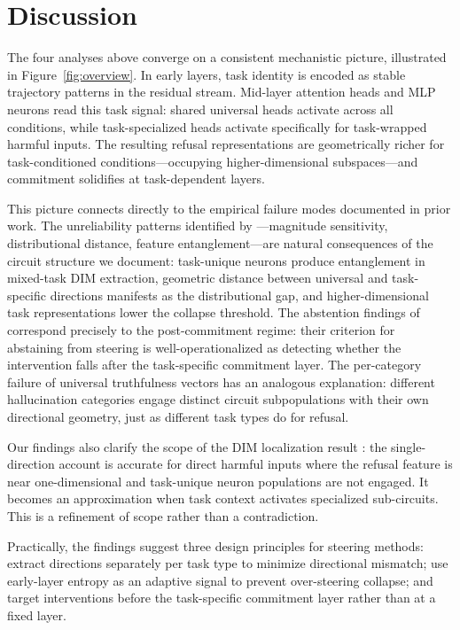 \documentclass[11pt]{article}
\begin{document}
\section{Discussion}
\label{sec:discussion}

The four analyses above converge on a consistent mechanistic picture, illustrated in Figure~\ref{fig:overview}. In early layers, task identity is encoded as stable trajectory patterns in the residual stream. Mid-layer attention heads and MLP neurons read this task signal: shared universal heads activate across all conditions, while task-specialized heads activate specifically for task-wrapped harmful inputs. The resulting refusal representations are geometrically richer for task-conditioned conditions---occupying higher-dimensional subspaces---and commitment solidifies at task-dependent layers.

This picture connects directly to the empirical failure modes documented in prior work. The unreliability patterns identified by \citet{braun2025unreliability}---magnitude sensitivity, distributional distance, feature entanglement---are natural consequences of the circuit structure we document: task-unique neurons produce entanglement in mixed-task DIM extraction, geometric distance between universal and task-specific directions manifests as the distributional gap, and higher-dimensional task representations lower the collapse threshold. The abstention findings of \citet{hedstrom2025steer} correspond precisely to the post-commitment regime: their criterion for abstaining from steering is well-operationalized as detecting whether the intervention falls after the task-specific commitment layer. The per-category failure of universal truthfulness vectors \citep{wang2025adaptive} has an analogous explanation: different hallucination categories engage distinct circuit subpopulations with their own directional geometry, just as different task types do for refusal.

Our findings also clarify the scope of the DIM localization result \citep{arditi2024refusal}: the single-direction account is accurate for direct harmful inputs where the refusal feature is near one-dimensional and task-unique neuron populations are not engaged. It becomes an approximation when task context activates specialized sub-circuits. This is a refinement of scope rather than a contradiction.

Practically, the findings suggest three design principles for steering methods: extract directions separately per task type to minimize directional mismatch; use early-layer entropy as an adaptive signal to prevent over-steering collapse; and target interventions before the task-specific commitment layer rather than at a fixed layer.
\end{document}
